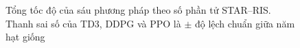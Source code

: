 \begin{figure}[htbp]
\centering
\resizebox{0.95\textwidth}{!}{}
\caption[Tổng tốc độ của sáu phương pháp theo số phần tử STAR--RIS]{Tổng tốc độ của sáu phương pháp theo số phần tử STAR--RIS. Thanh sai số của TD3, DDPG và PPO là $\pm$ độ lệch chuẩn giữa năm hạt giống}
\label{fig:ch4-tong-toc-do}
\end{figure}
